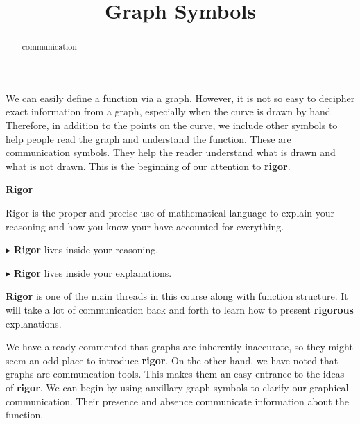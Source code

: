 \documentclass{ximera}
\title{Graph Symbols}
\begin{document}
\begin{abstract}
communication
\end{abstract}
\maketitle



We can easily define a function via a graph.  However, it is not so easy to decipher exact information from a graph, especially when the curve is drawn by hand.  Therefore, in addition to the points on the curve, we include other symbols to help people read the graph and understand the function.  These are communication symbols.  They help the reader understand what is drawn and what is not drawn.  This is the beginning of our attention to \textbf{\textcolor{purple!85!blue}{rigor}}.



\begin{definition} \textbf{\textcolor{green!50!black}{Rigor}} 


Rigor is the proper and precise use of mathematical language to explain your reasoning and how you know your have accounted for everything.



\textbf{$\blacktriangleright$} \textbf{\textcolor{green!50!black}{Rigor}} lives inside your reasoning. 

\textbf{$\blacktriangleright$} \textbf{\textcolor{green!50!black}{Rigor}} lives inside your explanations. 




\end{definition}



\textbf{\textcolor{purple!85!blue}{Rigor}} is one of the main threads in this course along with function structure.  It will take a lot of communication back and forth to learn how to present \textbf{\textcolor{purple!85!blue}{rigorous}} explanations. 


We have already commented that graphs are inherently inaccurate, so they might seem an odd place to introduce \textbf{\textcolor{purple!85!blue}{rigor}}.  On the other hand, we have noted that graphs are communcation tools. This makes them an easy entrance to the ideas of \textbf{\textcolor{purple!85!blue}{rigor}}.  We can begin by using auxillary graph symbols to clarify our graphical communication. Their presence and absence communicate information about the function.
\end{document}
